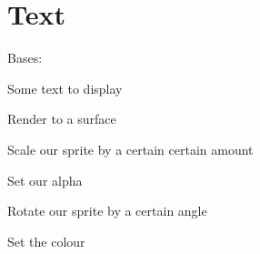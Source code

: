 \documentclass[letterpaper,10pt,english]{sphinxmanual}
\begin{document}
\section{Text}
\label{visual:text}

\begin{fulllineitems}
\label{visual:serge.visual.Text}
Bases: {\hyperref[visual:serge.visual.Drawing]{}}

Some text to display

\begin{fulllineitems}
\label{visual:serge.visual.Text.renderTo}
Render to a surface

\end{fulllineitems}


\begin{fulllineitems}
\label{visual:serge.visual.Text.scaleBy}
Scale our sprite by a certain certain amount

\end{fulllineitems}


\begin{fulllineitems}
\label{visual:serge.visual.Text.setAlpha}
Set our alpha

\end{fulllineitems}


\begin{fulllineitems}
\label{visual:serge.visual.Text.setAngle}
Rotate our sprite by a certain angle

\end{fulllineitems}


\begin{fulllineitems}
\label{visual:serge.visual.Text.setColour}
Set the colour


\end{fulllineitems}
\end{fulllineitems}
\end{document}
